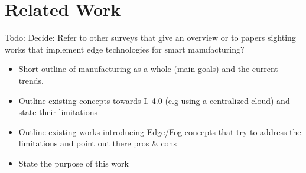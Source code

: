 \section{Related Work}\label{sec:relatedwork}

Todo: Decide: Refer to other surveys that give an overview or to papers sighting works that implement edge technologies for smart manufacturing?

\begin{itemize}
\item Short outline of manufacturing as a whole (main goals) and the current trends.
\item Outline existing concepts towards I. 4.0 (e.g using a centralized cloud) and state their limitations
\item Outline existing works introducing Edge/Fog concepts that try to address the limitations and point out there pros \& cons
\item State the purpose of this work 
\end{itemize}